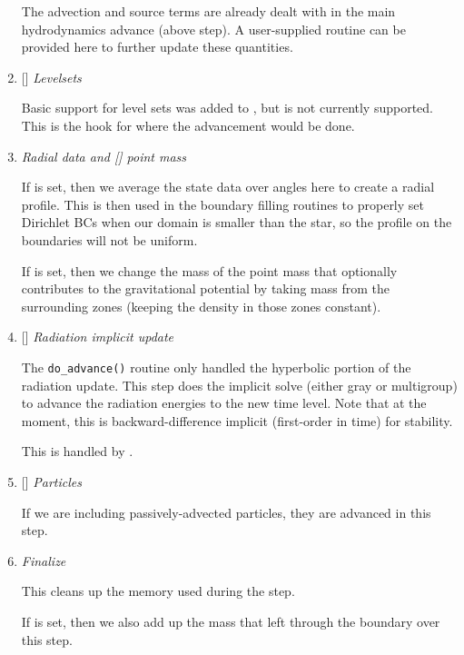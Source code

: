 \begin{enumerate}
  The advection and source terms are already dealt with in the 
  main hydrodynamics advance (above step).  A user-supplied routine
   can be provided here to further update these
  quantities.
  
\item {[]} {\em Levelsets} 

  Basic support for level sets was added to \castro, but is not currently
  supported.  This is the hook for where the advancement would be done.

\item {\em Radial data and {\rm[]} point mass} 

  If  is set, then we average the state data
  over angles here to create a radial profile.  This is then used in the 
  boundary filling routines to properly set Dirichlet BCs when our domain
  is smaller than the star, so the profile on the boundaries will not 
  be uniform.

  If  is set, then we
  change the mass of the point mass that optionally contributes to the
  gravitational potential by taking mass from the surrounding zones
  (keeping the density in those zones constant).

\item {[]} {\em Radiation implicit update} 

  The {\tt do\_advance()} routine only handled the hyperbolic
  portion of the radiation update.  This step does the implicit solve
  (either gray or multigroup) to advance the radiation energies to the 
  new time level.  Note that at the moment, this is backward-difference
  implicit (first-order in time) for stability.

  This is handled by .

\item {[]} {\em Particles} 

  If we are including passively-advected particles, they are
  advanced in this step.

\item {\em Finalize}

  This cleans up the memory used during the step.  

  If  is set, then we also add up
  the mass that left through the boundary over this step. 

\end{enumerate}

